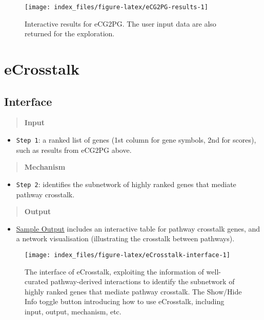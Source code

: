 \documentclass[
  oneside]{book}
\providecommand{\tightlist}{%
  \setlength{\itemsep}{0pt}\setlength{\parskip}{0pt}}
\begin{document}
\begin{figure}

{\centering \texttt{[image: index\_files/figure-latex/eCG2PG-results-1]} 

}

\caption{Interactive results for eCG2PG. The user input data are also returned for the exploration.}\label{fig:eCG2PG-results}
\end{figure}

\hypertarget{ecrosstalk}{%
\chapter{eCrosstalk}\label{ecrosstalk}}

\hypertarget{interface-2}{%
\section{Interface}\label{interface-2}}

\begin{quote}
\textbf{Input}
\end{quote}

\begin{itemize}
\tightlist
\item
  \texttt{Step\ 1}: a ranked list of genes (1st column for gene symbols, 2nd for scores), such as results from eCG2PG above.
\end{itemize}

\begin{quote}
\textbf{Mechanism}
\end{quote}

\begin{itemize}
\tightlist
\item
  \texttt{Step\ 2}: identifies the subnetwork of highly ranked genes that mediate pathway crosstalk.
\end{itemize}

\begin{quote}
\textbf{Output}
\end{quote}

\begin{itemize}
\tightlist
\item
  \href{http://www.genetictargets.com/app/examples/_tmp_RMD_eCrosstalk.html}{Sample Output} includes an interactive table for pathway crosstalk genes, and a network visualisation (illustrating the crosstalk between pathways).
\end{itemize}

\begin{figure}

{\centering \texttt{[image: index\_files/figure-latex/eCrosstalk-interface-1]} 

}

\caption{The interface of eCrosstalk, exploiting the information of well-curated pathway-derived interactions to identify the subnetwork of highly ranked genes that mediate pathway crosstalk. The Show/Hide Info toggle button introducing how to use eCrosstalk, including input, output, mechanism, etc.}\label{fig:eCrosstalk-interface}
\end{figure}
\end{document}
